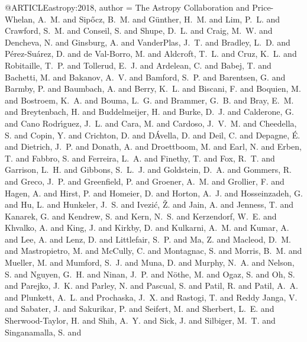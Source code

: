 @ARTICLE{astropy:2018,
   author = {{The Astropy Collaboration} and {Price-Whelan}, A.~M. and {Sip{\H o}cz}, B.~M. and
        {G{\"u}nther}, H.~M. and {Lim}, P.~L. and {Crawford}, S.~M. and
        {Conseil}, S. and {Shupe}, D.~L. and {Craig}, M.~W. and {Dencheva}, N. and
        {Ginsburg}, A. and {VanderPlas}, J.~T. and {Bradley}, L.~D. and
        {P{\'e}rez-Su{\'a}rez}, D. and {de Val-Borro}, M. and {Aldcroft}, T.~L. and
        {Cruz}, K.~L. and {Robitaille}, T.~P. and {Tollerud}, E.~J. and
        {Ardelean}, C. and {Babej}, T. and {Bachetti}, M. and {Bakanov}, A.~V. and
        {Bamford}, S.~P. and {Barentsen}, G. and {Barmby}, P. and {Baumbach}, A. and
        {Berry}, K.~L. and {Biscani}, F. and {Boquien}, M. and {Bostroem}, K.~A. and
        {Bouma}, L.~G. and {Brammer}, G.~B. and {Bray}, E.~M. and {Breytenbach}, H. and
        {Buddelmeijer}, H. and {Burke}, D.~J. and {Calderone}, G. and
        {Cano Rodr{\'{\i}}guez}, J.~L. and {Cara}, M. and {Cardoso}, J.~V.~M. and
        {Cheedella}, S. and {Copin}, Y. and {Crichton}, D. and {D{\'A}vella}, D. and
        {Deil}, C. and {Depagne}, {\'E}. and {Dietrich}, J.~P. and {Donath}, A. and
        {Droettboom}, M. and {Earl}, N. and {Erben}, T. and {Fabbro}, S. and
        {Ferreira}, L.~A. and {Finethy}, T. and {Fox}, R.~T. and {Garrison}, L.~H. and
        {Gibbons}, S.~L.~J. and {Goldstein}, D.~A. and {Gommers}, R. and
        {Greco}, J.~P. and {Greenfield}, P. and {Groener}, A.~M. and
        {Grollier}, F. and {Hagen}, A. and {Hirst}, P. and {Homeier}, D. and
        {Horton}, A.~J. and {Hosseinzadeh}, G. and {Hu}, L. and {Hunkeler}, J.~S. and
        {Ivezi{\'c}}, {\v Z}. and {Jain}, A. and {Jenness}, T. and {Kanarek}, G. and
        {Kendrew}, S. and {Kern}, N.~S. and {Kerzendorf}, W.~E. and
        {Khvalko}, A. and {King}, J. and {Kirkby}, D. and {Kulkarni}, A.~M. and
        {Kumar}, A. and {Lee}, A. and {Lenz}, D. and {Littlefair}, S.~P. and
        {Ma}, Z. and {Macleod}, D.~M. and {Mastropietro}, M. and {McCully}, C. and
        {Montagnac}, S. and {Morris}, B.~M. and {Mueller}, M. and {Mumford}, S.~J. and
        {Muna}, D. and {Murphy}, N.~A. and {Nelson}, S. and {Nguyen}, G.~H. and
        {Ninan}, J.~P. and {N{\"o}the}, M. and {Ogaz}, S. and {Oh}, S. and
        {Parejko}, J.~K. and {Parley}, N. and {Pascual}, S. and {Patil}, R. and
        {Patil}, A.~A. and {Plunkett}, A.~L. and {Prochaska}, J.~X. and
        {Rastogi}, T. and {Reddy Janga}, V. and {Sabater}, J. and {Sakurikar}, P. and
        {Seifert}, M. and {Sherbert}, L.~E. and {Sherwood-Taylor}, H. and
        {Shih}, A.~Y. and {Sick}, J. and {Silbiger}, M.~T. and {Singanamalla}, S. and
}}
